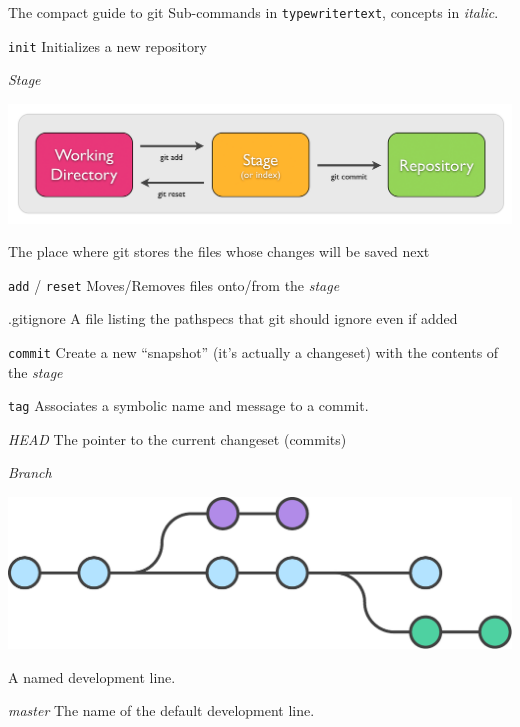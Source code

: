 \documentclass[presentation]{beamer}
\begin{document}
\begin{frame}{The compact guide to git}
	Sub-commands in \texttt{typewritertext}, concepts in \textit{italic}.
	\begin{block}{\texttt{init}}
		Initializes a new repository
	\end{block}
	\begin{block}{\textit{Stage}}
		\begin{center}
			\includegraphics[width=.5\textwidth]{images/staging}
		\end{center}
		The place where git stores the files whose changes will be saved next
	\end{block}
	\begin{block}{\texttt{add} / \texttt{reset}}
		Moves/Removes files onto/from the \textit{stage}
	\end{block}
	\begin{block}{.gitignore}
		A file listing the pathspecs that git should ignore even if added
	\end{block}
	\begin{block}{\texttt{commit}}
		Create a new ``snapshot'' (it's actually a changeset) with the contents of the \textit{stage}
	\end{block}
	\begin{block}{\texttt{tag}}
		Associates a symbolic name and message to a commit.
	\end{block}
	\begin{block}{\textit{HEAD}}
		The pointer to the current changeset (commits)
	\end{block}
	\begin{block}{\textit{Branch}}
		\begin{center}
			\includegraphics[width=.5\textwidth]{images/branches}
		\end{center}
		A named development line.
	\end{block}
	\begin{block}{\textit{master}}
		The name of the default development line.
	\end{block}

\end{frame}
\end{document}
